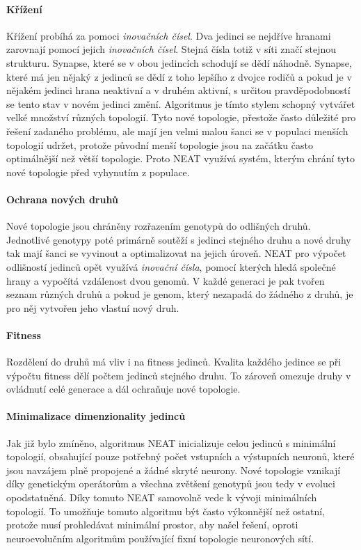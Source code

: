 \paragraph{Křížení}
Křížení probíhá za pomoci \emph{inovačních čísel}. Dva jedinci se nejdříve
hranami zarovnají pomocí jejich \emph{inovačních čísel}. Stejná čísla totiž v
síti značí stejnou strukturu. Synapse, které se v obou jedincích schodují se
dědí náhodně. Synapse, které má jen nějaký z jedinců se dědí z toho lepšího z
dvojce rodičů a pokud je v nějakém jedinci hrana neaktivní a v druhém aktivní,
s určitou pravděpodobností se tento stav v novém jedinci změní. Algoritmus je
tímto stylem schopný vytvářet velké množství různých topologií. Tyto nové
topologie, přestože často důležité pro řešení zadaného problému, ale mají jen
velmi malou šanci se v populaci menších topologií udržet, protože původní menší
topologie jsou na začátku často optimálnější než větší topologie. Proto NEAT
využívá systém, kterým chrání tyto nové topologie před vyhynutím z populace.

\paragraph{Ochrana nových druhů}
Nové topologie jsou chráněny rozřazením genotypů do odlišných druhů. Jednotlivé
genotypy poté primárně soutěží s jedinci stejného druhu a nové druhy tak mají
šanci se vyvinout a optimalizovat na jejich úroveň. NEAT pro výpočet odlišností
jedinců opět využívá \emph{inovační čísla}, pomocí kterých hledá společné hrany
a vypočítá vzdálenost dvou genomů. V každé generaci je pak tvořen seznam
různých druhů a pokud je genom, který nezapadá do žádného z druhů, je pro něj
vytvořen jeho vlastní nový druh.

\paragraph{Fitness}
Rozdělení do druhů má vliv i na fitness jedinců. Kvalita každého jedince se při
výpočtu fitness dělí počtem jedinců stejného druhu. To zároveň omezuje druhy v
ovládnutí celé generace a dál ochraňuje nové topologie.

\paragraph{Minimalizace dimenzionality jedinců}
Jak již bylo zmíněno, algoritmus NEAT inicializuje celou jedinců s minimální
topologií, obsahující pouze potřebný počet vstupních a výstupních neuronů,
které jsou navzájem plně propojené a žádné skryté neurony. Nové topologie
vznikají díky genetickým operátorům a všechna zvětšení genotypů jsou tedy v
evoluci opodstatněná. Díky tomuto NEAT samovolně vede k vývoji minimálních
topologií. To umožňuje tomuto algoritmu být často výkonnější než ostatní,
protože musí prohledávat minimální prostor, aby našel řešení, oproti
neuroevolučním algoritmům používající fixní topologie neuronových sítí.

